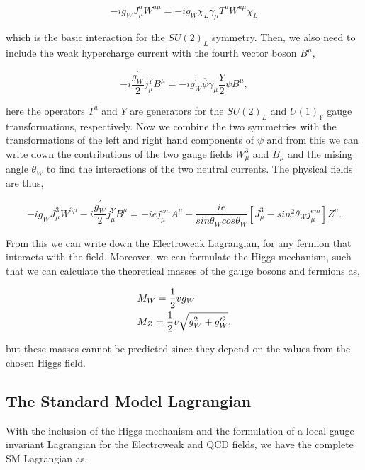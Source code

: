 \begin{equation}
-ig_WJ^a_\mu W^{a\mu}=-ig_W\overline{\chi}_L\gamma_\mu T^aW^{a\mu}\chi_L
\end{equation}

which is the basic interaction for the $SU(2)_L$ symmetry. Then, we also need to include the weak hypercharge current with the fourth vector boson $B^\mu$,

\begin{equation}
-i\frac{g_W^{\prime}}{2}j_\mu^YB^\mu=-ig_W^{\prime}\overline{\psi}\gamma_\mu\frac{Y}{2}\psi B^\mu, 
\end{equation}

here the operators $T^a$ and $Y$ are generators for the $SU(2)_L$ and $U(1)_Y$ gauge transformations, respectively. Now we combine the two symmetries with the transformations of the left and right hand components of $\psi$ and from this we can write down the contributions of the two gauge fields $W_\mu^3$ and $B_\mu$ and the mising angle $\theta_W$ to find the interactions of the two neutral currents. The physical fields are thus,

\begin{equation}
-ig_WJ_\mu^3W^{3\mu}-i\frac{g_W^{\prime}}{2}j_\mu^YB^\mu=-iej_\mu^{em}A^\mu-\frac{ie}{sin\theta_Wcos\theta_W}[J_\mu^3-sin^2\theta_Wj_\mu^{em}]Z^\mu.
\end{equation}

From this we can write down the Electroweak Lagrangian, for any fermion that interacts with the field. Moreover, we can formulate the Higgs mechanism, such that we can calculate the theoretical masses of the gauge bosons and fermions as, 

\begin{equation}
\begin{split}
& M_{W}=\frac{1}{2}vg_W \\
& M_{Z}=\frac{1}{2}v\sqrt{g_W^2+g_W^{\prime 2}},
\end{split}
\end{equation}

but these masses cannot be predicted since they depend on the values from the chosen Higgs field. 

\subsection{The Standard Model Lagrangian}

With the inclusion of the Higgs mechanism and the formulation of a local gauge invariant Lagrangian for the Electroweak and QCD fields, we have the complete SM Lagrangian as,

